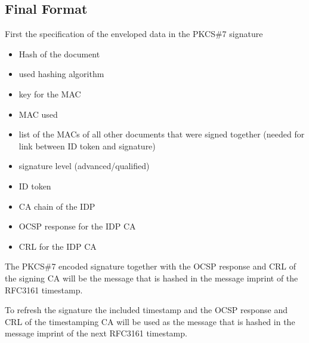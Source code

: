 \subsection{Final Format}

First the specification of the enveloped data in the \gls{PKCS}\#7 signature

\begin{itemize}
    \item Hash of the document
    \item used hashing algorithm
    \item key for the \gls{MAC}
    \item \gls{MAC} used
    \item list of the \gls{MAC}s of all other documents that were signed together (needed for link between ID token and signature)
    \item signature level (advanced/qualified)
    \item ID token
    \item \gls{CA} chain of the \gls{IDP}
    \item \gls{OCSP} response for the \gls{IDP} \gls{CA}
    \item \gls{CRL} for the \gls{IDP} \gls{CA}
\end{itemize}

The \gls{PKCS}\#7 encoded signature together with the \gls{OCSP} response and \gls{CRL} of the signing \gls{CA} will be the message that is hashed in the message imprint of the \gls{RFC}3161 timestamp.

To refresh the signature the included timestamp and the \gls{OCSP} response and \gls{CRL} of the timestamping \gls{CA} will be used as the message that is hashed in the message imprint of the next \gls{RFC}3161 timestamp.
